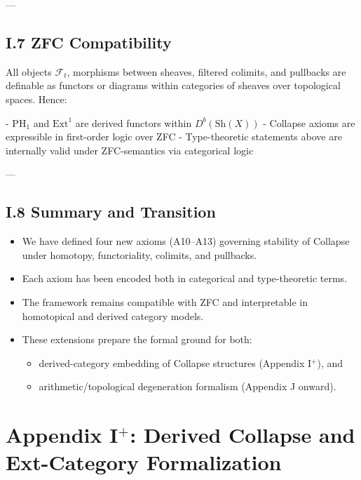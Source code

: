 \documentclass[11pt]{article}
\begin{document}
---

\subsection*{I.7 ZFC Compatibility}

All objects $\mathcal{F}_t$, morphisms between sheaves, filtered colimits, and pullbacks are definable as functors or diagrams within categories of sheaves over topological spaces. Hence:

- $\mathrm{PH}_1$ and $\mathrm{Ext}^1$ are derived functors within $D^b(\text{Sh}(X))$
- Collapse axioms are expressible in first-order logic over ZFC
- Type-theoretic statements above are internally valid under ZFC-semantics via categorical logic

---

\subsection*{I.8 Summary and Transition}

\begin{itemize}
  \item We have defined four new axioms (A10–A13) governing stability of Collapse under homotopy, functoriality, colimits, and pullbacks.
  \item Each axiom has been encoded both in categorical and type-theoretic terms.
  \item The framework remains compatible with ZFC and interpretable in homotopical and derived category models.
  \item These extensions prepare the formal ground for both:
  \begin{itemize}
    \item derived-category embedding of Collapse structures (Appendix I$^{+}$), and
    \item arithmetic/topological degeneration formalism (Appendix J onward).
  \end{itemize}
\end{itemize}





\section*{Appendix I$^{+}$: Derived Collapse and Ext-Category Formalization}
\end{document}
